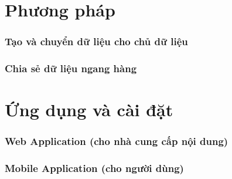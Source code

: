 \chapter{Phương pháp}
\subsection{Tạo và chuyển dữ liệu cho chủ dữ liệu}

\subsection{Chia sẻ dữ liệu ngang hàng}

\chapter{Ứng dụng và cài đặt}
\subsection{Web Application (cho nhà cung cấp nội dung)}

\subsection{Mobile Application (cho người dùng)}

